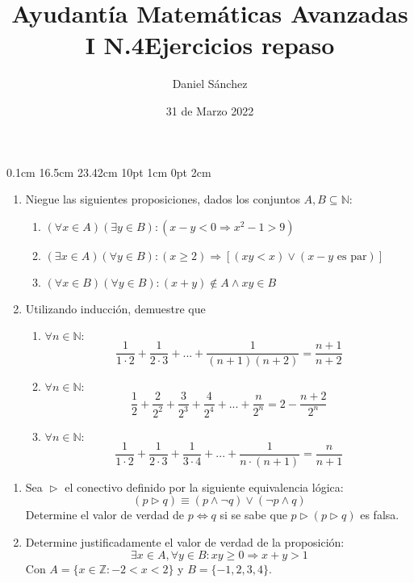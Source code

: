 \documentclass[12pt]{article}
\begin{document}
\setmargins{2.5cm}
{0.1cm}
{16.5cm}
{23.42cm}
{10pt}
{1cm}
{0pt}
{2cm}

\title{Ayudant\'ia Matem\'aticas Avanzadas I N.4}
\date{31 de Marzo 2022}
\author{Daniel S\'anchez}
\maketitle

\begin{enumerate}
      \item Niegue las siguientes proposiciones, dados los conjuntos $A,B \subseteq \mathbb{N}$:
            \begin{enumerate}
                  \item $(\forall x \in A)(\exists y \in B): (x-y<0 \Rightarrow x^{2}-1>9)$
                  \item $(\exists x \in A)(\forall y \in B): (x \geq 2) \Rightarrow [(xy<x) \lor (x-y \mbox{ es par})]$
                  \item $(\forall x \in B)(\forall y \in B): (x+y) \notin A \land xy \in B$
            \end{enumerate}
      \item Utilizando inducci\'on, demuestre que
            \begin{enumerate}
                  \item $\forall n \in \mathbb{N}:$
                        $$\frac{1}{1 \cdot 2}+\frac{1}{2\cdot 3}+...+\frac{1}{(n+1)(n+2)}=\frac{n+1}{n+2}$$
                  \item $\forall n \in \mathbb{N}:$
                        $$\frac{1}{2}+\frac{2}{2^2}+\frac{3}{2^3}+\frac{4}{2^4}+...+\frac{n}{2^n}=2-\frac{n+2}{2^n}$$
                  \item $\forall n \in \mathbb{N}:$
                        $$\frac{1}{1\cdot 2}+\frac{1}{2\cdot 3}+\frac{1}{3\cdot 4}+...+\frac{1}{n\cdot (n+1)}=\frac{n}{n+1}$$
            \end{enumerate}
\end{enumerate}


\pagebreak
\title{\LARGE{\textbf{Ejercicios repaso}}}
\maketitle
\begin{enumerate}
      \item Sea $\vartriangleright$ el conectivo definido por la siguiente equivalencia l\'ogica:
            $$(p \vartriangleright q)\equiv (p \land \neg q)\lor (\neg p \land q)$$
            Determine el valor de verdad de $p\Leftrightarrow q$ si se sabe que $p \vartriangleright (p \vartriangleright q)$ es falsa.
      \item Determine justificadamente el valor de verdad de la proposici\'on:
            $$\exists x \in A, \forall y \in B: xy \geq 0 \Rightarrow x+y>1$$
            Con $A=\{x \in \mathbb{Z}: -2<x<2\}$ y $B=\{-1,2,3,4\}$.
\end{enumerate}
\end{document}
